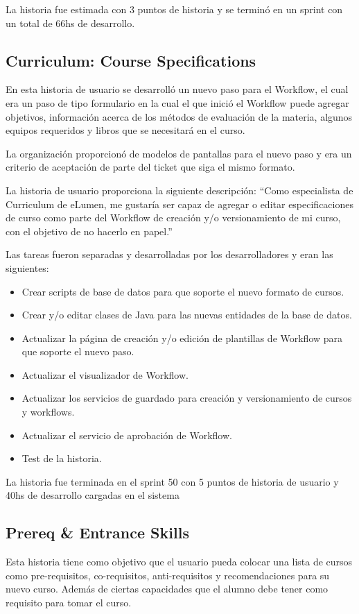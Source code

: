 La historia fue estimada con 3 puntos de historia y se terminó en un sprint con un total de 66hs de desarrollo.

\subsection{Curriculum: Course Specifications}
En esta historia de usuario se desarrolló un nuevo paso para el Workflow, el cual era un paso de tipo formulario en la cual el que inició el Workflow puede agregar objetivos, información acerca de los métodos de evaluación de la materia, algunos equipos requeridos y libros que se necesitará en el curso.

La organización proporcionó de modelos de pantallas para el nuevo paso y era un criterio de aceptación de parte del ticket que siga el mismo formato.

La historia de usuario proporciona la siguiente descripción: “Como especialista de Curriculum de eLumen, me gustaría ser capaz de agregar o editar especificaciones de curso como parte del Workflow de creación y/o versionamiento de mi curso, con el objetivo de no hacerlo en papel.”

Las tareas fueron separadas y desarrolladas por los desarrolladores y eran las siguientes:
\begin{itemize}
	\item Crear scripts de base de datos para que soporte el nuevo formato de cursos.
	\item Crear y/o editar clases de Java para las nuevas entidades de la base de datos.
	\item Actualizar la página de creación y/o edición de plantillas de Workflow para que soporte el nuevo paso.
	\item Actualizar el visualizador de Workflow.
	\item Actualizar los servicios de guardado para creación y versionamiento de cursos y workflows.
	\item Actualizar el servicio de aprobación de Workflow.
	\item Test de la historia.
\end{itemize}

La historia fue terminada en el sprint 50 con 5 puntos de historia de usuario y 40hs de desarrollo cargadas en el sistema

\subsection{Prereq \& Entrance Skills}
Esta historia tiene como objetivo que el usuario pueda colocar una lista de cursos como pre-requisitos, co-requisitos, anti-requisitos y recomendaciones para su nuevo curso. Además de ciertas capacidades que el alumno debe tener como requisito para tomar el curso.


